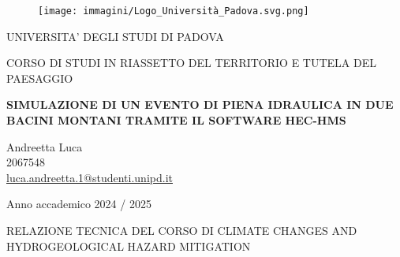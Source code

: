 \begin{figure}[H]\centering
    \texttt{[image: immagini/Logo\_Università\_Padova.svg.png]}
\end{figure}
\begin{center}

{\Large UNIVERSITA' DEGLI STUDI DI PADOVA }\\
  \vspace{0.4 cm}
  
{\Large CORSO DI STUDI IN RIASSETTO DEL TERRITORIO E TUTELA DEL PAESAGGIO } \\ 
    \vspace{0.4 cm}
    
    \vspace{1 cm}

{\huge \textbf{SIMULAZIONE DI UN EVENTO DI PIENA IDRAULICA IN DUE BACINI MONTANI TRAMITE IL SOFTWARE HEC-HMS} }
\vspace{0.75 cm}

\normalsize
\end{center}

{\Large \begin{center}
Andreetta Luca \\
2067548 \\
\href{mailto:luca.andreetta.1@studenti.unipd.it}{luca.andreetta.1@studenti.unipd.it}
\end{center}
\vspace{1 cm}

\thispagestyle{empty}
\begin{center}
	Anno accademico 2024 / 2025
\end{center}

\vspace{2 cm}
\begin{center}
    RELAZIONE TECNICA DEL CORSO DI CLIMATE CHANGES AND HYDROGEOLOGICAL HAZARD MITIGATION 
\end{center}
}

\newpage